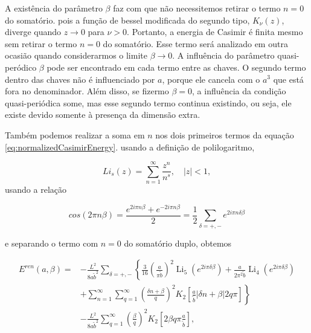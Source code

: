 A existência do parâmetro $\beta$ faz com que não necessitemos retirar o termo $n=0$ do somatório. pois a função de bessel modificada do segundo tipo, $K_\nu(z)$, diverge quando $z \to 0$ para $\nu > 0$. Portanto, a energia de Casimir é finita mesmo sem retirar o termo $n=0$ do somatório. Esse termo será analizado em outra ocasião quando considerarmos o limite $\beta \to 0$. A influência do parâmetro quasi-peródico $\beta$ pode ser encontrado em cada termo entre as chaves. O segundo termo dentro das chaves não é influenciado por $a$, porque ele cancela com o $a^3$ que está fora no denominador. Além disso, se fizermo $\beta = 0$, a influência da condição quasi-periódica some, mas esse segundo termo continua existindo, ou seja, ele existe devido somente à presença da dimensão extra. 

Também podemos realizar a soma em $n$ nos dois primeiros termos da equação \eqref{eq:normalizedCasimirEnergy}. usando a definição de polilogaritmo,

\begin{equation}
    Li_s(z) = \sum_{n=1}^\infty \frac{z^n}{n^s}, \quad |z| < 1 \label{eq:polilogDef},
\end{equation}
usando a relação 

\begin{equation}
    cos(2\pi n \beta) = \frac{e^{2i\pi n \beta} + e^{-2i\pi n \beta}}{2} = \frac{1}{2} \sum_{\delta = +,-} e^{2i\pi n \delta \beta} \label{eq:cosExp}
\end{equation}

e separando o termo com $n=0$ do somatório duplo, obtemos

\begin{equation}
\begin{aligned}
E^{ren}(a,\beta) =& -\frac{L^{2}}{8a\tilde{b}^{2}}\sum_{\delta=+,-} \left\{ \frac{3}{16} \left( \frac{a}{\pi\tilde{b}}\right)^{2} \operatorname{Li}_{5} \left(e^{2i\pi\delta\beta}\right) + \frac{a}{2\pi^{2}\tilde{b}}\operatorname{Li}_{4}\left(e^{2i\pi\delta\beta}\right) \right. \\ 
&+ \left. \sum_{n=1}^{\infty}\sum_{q=1}^{\infty}\left(\frac{\delta n+\beta}{q}\right)^{2}K_{2}\left[\frac{a}{\tilde{b}}\left|\delta n+\beta\right|2q\pi\right]\right\} \\
&- \frac{L^{2}}{8a\tilde{b}^{2}}\sum_{q=1}^{\infty}\left(\frac{\beta}{q}\right)^{2}K_{2}\left[2\beta q\pi\frac{a}{\tilde{b}}\right], \label{eq:casimirEnergyWithDelta}
\end{aligned}
\end{equation}

